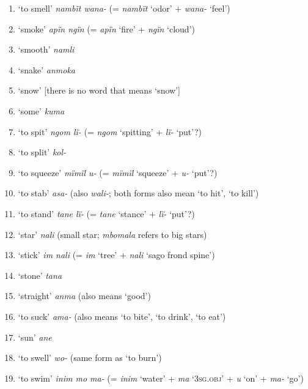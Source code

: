 \begin{enumerate}[noitemsep, label={\arabic*}, align=left, widest=190, labelsep=1ex,leftmargin=*]
\item ‘to smell’ \textit{nambït wana-} (= \textit{nambït} ‘odor’ + \textit{wana-} ‘feel’)

\item ‘smoke’ \textit{apïn ngïn} (= \textit{apïn} ‘fire’ + \textit{ngïn} ‘cloud’)

\item ‘smooth’ \textit{namli}

\item ‘snake’ \textit{anmoka}

\item ‘snow’ [there is no word that means ‘snow’]

\item ‘some’ \textit{kuma}

\item ‘to spit’ \textit{ngom lï-} (= \textit{ngom} ‘spitting’ + \textit{lï-} ‘put’?)

\item ‘to split’ \textit{kol-}

\item ‘to squeeze’ \textit{mïmïl u-} (= \textit{mïmïl} ‘squeeze’ + \textit{u-} ‘put’?)

\item ‘to stab’ \textit{asa-} (also \textit{wali-}; both forms also mean ‘to hit’, ‘to kill’)

\item ‘to stand’ \textit{tane lï-} (= \textit{tane} ‘stance’ + \textit{lï-} ‘put’?)

\item ‘star’ \textit{nali} (small star; \textit{mbomala} refers to big stars)

\item ‘stick’ \textit{im nali} (= \textit{im} ‘tree’ + \textit{nali} ‘sago frond spine’)

\item ‘stone’ \textit{tana}

\item ‘straight’ \textit{anma} (also means ‘good’)

\item ‘to suck’ \textit{ama-} (also means ‘to bite’, ‘to drink’, ‘to eat’)

\item ‘sun’ \textit{ane}

\item ‘to swell’ \textit{wo-} (same form as ‘to burn’)

\item ‘to swim’ \textit{inim mo ma-} (= \textit{inim} ‘water’ + \textit{ma} ‘3\textsc{sg.obj}’ + \textit{u} ‘on’ + \textit{ma-} ‘go’)


\end{enumerate}

